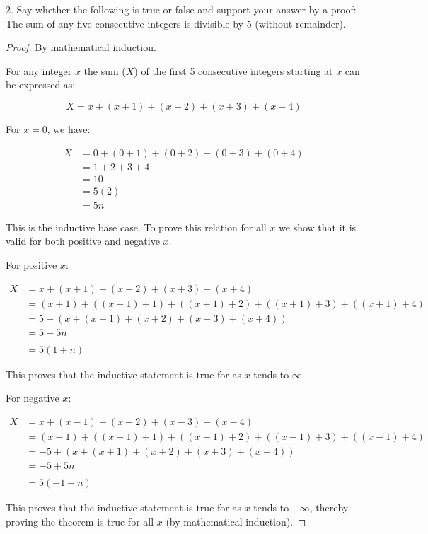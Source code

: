 \documentclass[a4paper,12pt]{article}
\begin{document}
2. Say whether the following is true or false and support your answer by a proof: 
The sum of any five consecutive integers is divisible by 5 (without remainder).

\begin{proof}

  By mathematical induction.

  For any integer $x$ the sum ($X$) of the first 5 consecutive integers starting at
  $x$ can be expressed as:

  $$X = x + (x + 1) + (x + 2) + (x + 3) + (x + 4)$$

  For $x = 0$, we have:

\begin{align*} 
  X &= 0 + (0 + 1) + (0 + 2) + (0 + 3) + (0 + 4) \\
    &= 1 + 2 + 3 + 4 \\
    &= 10 \\
    &= 5(2) \\
    &= 5n \tag{divisible by five}
\end{align*}

This is the inductive base case. To prove this relation for all $x$ we show that
it is valid for both positive and negative $x$.

For positive $x$:

\begin{align*} 
  X &= x + (x + 1) + (x + 2) + (x + 3) + (x + 4) \\
    &= (x + 1) + ((x + 1) + 1) + ((x + 1) + 2) + ((x + 1) + 3) + ((x + 1) + 4) 
  \tag{subsitute x+1} \\
    &= 5 + (x + (x + 1) + (x + 2) + (x + 3) + (x + 4)) 
  \tag{bring plus ones out the front} \\
    &= 5 + 5n \\ \tag{from the inductive statement} \\
    &= 5(1 + n)
\end{align*}

This proves that the inductive statement is true for as $x$ tends to $\infty$.

For negative $x$:

\begin{align*} 
  X &= x + (x - 1) + (x - 2) + (x - 3) + (x - 4) \\
    &= (x - 1) + ((x - 1) + 1) + ((x - 1) + 2) + ((x - 1) + 3) + ((x - 1) + 4) 
  \tag{subsitute x+1} \\
    &= -5 + (x + (x + 1) + (x + 2) + (x + 3) + (x + 4)) 
  \tag{bring plus ones out the front} \\
    &= -5 + 5n \\ \tag{from the inductive statement} \\
    &= 5(-1 + n)
\end{align*}

This proves that the inductive statement is true for as $x$ tends to $-\infty$,
thereby proving the theorem is true for all $x$ (by mathematical induction).
  
\end{proof}
\end{document}
